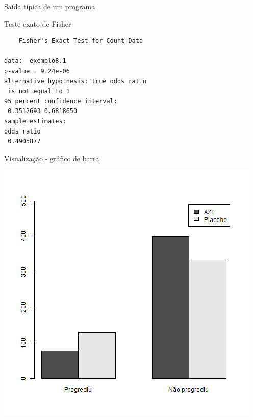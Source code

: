 \documentclass{beamer}
\begin{document}
\begin{frame}[fragile]{Saída típica de um programa}
  \begin{block}{Teste exato de Fisher}
    \footnotesize
\begin{verbatim}
	Fisher's Exact Test for Count Data

data:  exemplo8.1
p-value = 9.24e-06
alternative hypothesis: true odds ratio
 is not equal to 1
95 percent confidence interval:
 0.3512693 0.6818650
sample estimates:
odds ratio
 0.4905877
\end{verbatim}
  \end{block}
\end{frame}

\begin{frame}{Visualização - gráfico de barra}
  \begin{center}
    \includegraphics[height=\textheight]{Cap26-27/barplot}
  \end{center}
\end{frame}
\end{document}
